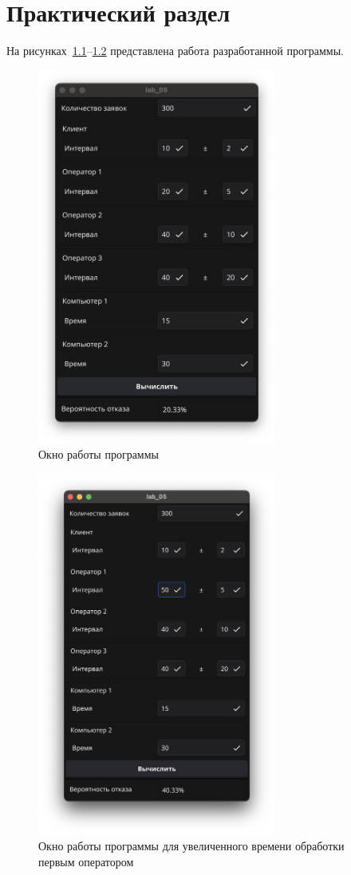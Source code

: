 \chapter{Практический раздел}

На рисунках~\ref{fig:1}--\ref{fig:2} представлена работа разработанной программы.

\begin{figure}[ht]
    \centering
    \includegraphics[width=0.7\textwidth]{assets/1.png}
    \caption{Окно работы программы}
    \label{fig:1}
\end{figure}

\newpage

\begin{figure}[ht]
    \centering
    \includegraphics[width=0.7\textwidth]{assets/2.png}
    \caption{Окно работы программы для увеличенного времени обработки первым оператором}
    \label{fig:2}
\end{figure}


